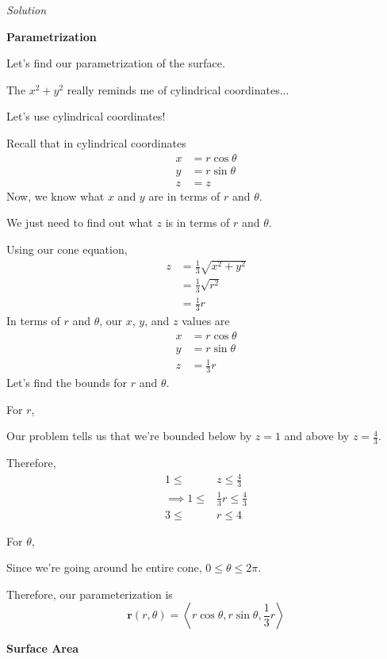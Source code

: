 \documentclass{article}
\newcommand{\lra}[1]{\left\langle #1 \right\rangle}
\renewcommand{\r}[0]{\mathbf{r}}
\newcommand{\Solution}{\textit{Solution}}
\begin{document}
\Solution

{}\textbf{Parametrization}

Let's find our parametrization of the surface.

The $x^2+y^2$ really reminds me of cylindrical coordinates...

Let's use cylindrical coordinates!

Recall that in cylindrical coordinates
\begin{align*}
    x&=r\cos\theta\\
    y&=r\sin\theta\\
    z&=z
\end{align*}
Now, we know what $x$ and $y$ are in terms of $r$ and $\theta$.

We just need to find out what $z$ is in terms of $r$ and $\theta$.

Using our cone equation,
\begin{align*}
    z&=\frac{1}{3}\sqrt{x^2+y^2}\\
    &=\frac{1}{3}\sqrt{r^2}\tag{in polar, $x^2+y^2=r^2$}\\
    &=\frac{1}{3}r\tag{$r\geq 0$ is always true}
\end{align*}
In terms of $r$ and $\theta$, our $x$, $y$, and $z$ values are
\begin{align*}
    x&=r\cos\theta\\
    y&=r\sin\theta\\
    z&=\frac{1}{3}r
\end{align*}
Let's find the bounds for $r$ and $\theta$.

For $r$,

Our problem tells us that we're bounded below by $z=1$ and above by $z=\frac{4}{3}$.

Therefore,
\begin{align*}
    1\leq&z\leq \frac{4}{3}\\
    \implies 1\leq &\frac{1}{3}r\leq \frac{4}{3}\\
    3\leq &r \leq 4
\end{align*}

For $\theta$,

Since we're going around he entire cone, $0\leq \theta\leq 2\pi$.

Therefore, our parameterization is
\begin{equation*}
    \r(r,\theta)=\lra{r\cos\theta, r\sin\theta, \frac{1}{3}r}\tag{$3\leq r\leq 4$, $0\leq \theta\leq 2\pi$}
\end{equation*}
{}\textbf{Surface Area}
\end{document}
